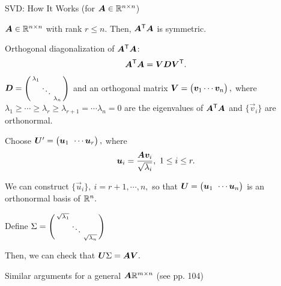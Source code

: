 \documentclass[handout,fleqn,aspectratio=169]{beamer}
\begin{document}
\begin{frame}{SVD: How It Works (for $\bm{A} \in {\mathbb R}^{n \times n}$)}

{
\plitemsep 0.03in
\small
\bci 
\item $\bm{A} \in {\mathbb R}^{n \times n}$ with rank $r \le n.$ Then, ${\bm{A}}^{\mathsf{T}}\bm{A}$ is symmetric. 

\item Orthogonal diagonalization of ${\bm{A}}^{\mathsf{T}}\bm{A}$: 
$${\bm{A}}^{\mathsf{T}}\bm{A} = \bm{V} \bm{D} {\bm{V}}^{\mathsf{T}}.$$
\item $\bm{D} = \left(\begin{smallmatrix}
\lambda_1 & & \cr
 &\ddots & \cr
&& \lambda_n
\end{smallmatrix}\right)$ and an orthogonal matrix $\mV = \rowvec{\vec{v}_1 \cdots \vec{v}_n},$
where $\lambda_1 \ge \cdots \ge \lambda_r \ge \lambda_{r+1} = \cdots \lambda_n =0$ are the eigenvalues of ${\bm{A}}^{\mathsf{T}}\bm{A}$ and $\{\vec{v}_i\}$ are orthonormal.

\item {}
\vspace{-0.2cm}
\eci
}
{
\plitemsep 0.03in
\small
\bci
\item {}

\item Choose $\mU' = \rowvec{\vec{u}_1 & \cdots \vec{u}_r},$ where 
$$\bm{u}_i= \frac{\bm{A} \bm{v}_i}{\sqrt{\lambda_i}}, \ 1\le i \le r.$$

\item We can construct $\{\vec{u}_i\}, \ i = r+1, \cdots, n,$ so that $\mU = \rowvec{\vec{u}_1 & \cdots \vec{u}_n}$ is an orthonormal basis of ${\mathbb R}^{n}.$

\item Define $\Sigma = \left(\begin{smallmatrix}
\sqrt{\lambda_1} & & \cr
 &\ddots & \cr
&& \sqrt{\lambda_n}
\end{smallmatrix}\right)$

\item Then, we can check that $\bm{U} \Sigma = \bm{A} \bm{V}.$

\item Similar arguments for a general $\bm{A} {\mathbb R}^{m \times n}$ (see pp. 104) 
\eci
}

\end{frame}
\end{document}
